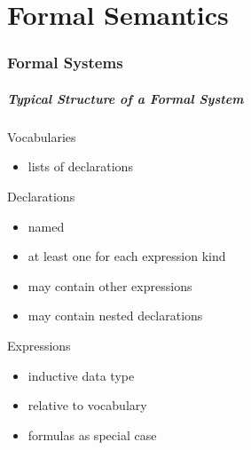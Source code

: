 %

\part{Formal Semantics}

\section{Formal Systems}

\begin{frame}\frametitle{Typical Structure of a Formal System}
Vocabularies
\begin{itemize}
\item lists of declarations
\end{itemize}

Declarations
\begin{itemize}
\item named
\item at least one for each expression kind
\item may contain other expressions 
\item may contain nested declarations 
\end{itemize}

Expressions
\begin{itemize}
\item inductive data type
\item relative to vocabulary 
\item formulas as special case
\end{itemize}
\end{frame}

